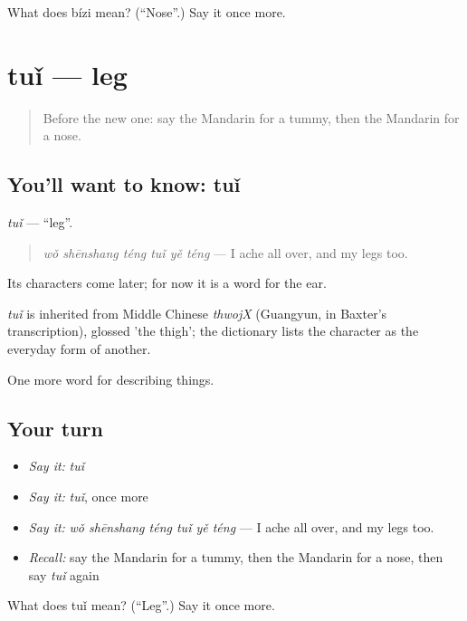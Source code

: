 \begin{tcolorbox}[breakable,colback=teal!4,colframe=teal!35!black,title={Before you move on}]
What does bízi mean? (\textquotedblleft{}Nose\textquotedblright{}.) Say it once more.
\end{tcolorbox}
\section[tuǐ]{tuǐ — leg}

\label{lesson:ZH-C230-tui}



\begin{quote}
Before the new one: say the Mandarin for a tummy, then the Mandarin for a nose.
\end{quote}

\subsection*{You'll want to know: tuǐ}
\emph{tuǐ} — \textquotedblleft{}leg\textquotedblright{}.

\begin{quote}
\emph{wǒ shēnshang téng tuǐ yě téng} — I ache all over, and my legs too.
\end{quote}

Its characters come later; for now it is a word for the ear.

\begin{cousinweb}
\emph{tuǐ} is inherited from Middle Chinese \emph{thwojX} (Guangyun, in Baxter's transcription), glossed 'the thigh'; the dictionary lists the character as the everyday form of another.
\end{cousinweb}

\begin{grammarlens}[title={What you've built}]
One more word for describing things.
\end{grammarlens}

\subsection*{Your turn}
\begin{itemize}
\raggedright
  \item \emph{Say it:} \emph{tuǐ}
  \item \emph{Say it:} \emph{tuǐ}, once more
  \item \emph{Say it:} \emph{wǒ shēnshang téng tuǐ yě téng} — I ache all over, and my legs too.
  \item \emph{Recall:} say the Mandarin for a tummy, then the Mandarin for a nose, then say \emph{tuǐ} again
\end{itemize}

\begin{tcolorbox}[breakable,colback=teal!4,colframe=teal!35!black,title={Before you move on}]
What does tuǐ mean? (\textquotedblleft{}Leg\textquotedblright{}.) Say it once more.
\end{tcolorbox}
